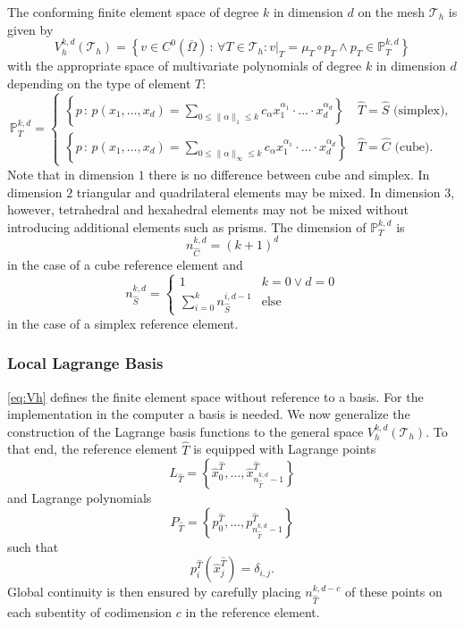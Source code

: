 \documentclass[a4paper,12pt]{article}
\begin{document}
The conforming finite element space of degree $k$ in dimension $d$ on the mesh
$\mathcal{T}_h$ is given by
\begin{equation}
V_h^{k,d}(\mathcal{T}_h) = \left\{ v\in C^0(\overline{\Omega}) \,:\, 
\forall T\in\mathcal{T}_h : v|_T = \mu_T \circ p_T \wedge p_T\in\mathbb{P}_T^{k,d}\right\}
\label{eq:Vh}
\end{equation}
with the appropriate space of multivariate polynomials of degree $k$ in dimension $d$
depending on the type of element $T$:
\begin{equation}
\mathbb{P}_T^{k,d} = \left\{\begin{array}{ll}
\left\{ p\,:\, p(x_1,\ldots,x_d) = \sum\limits_{0\leq\|\alpha\|_1\leq k} c_\alpha
x_1^{\alpha_1}\cdot\ldots\cdot x_d^{\alpha_d}\right\} & \text{$\hat T = \hat S$ (simplex)}, \\
\left\{ p\,:\, p(x_1,\ldots,x_d) = \sum\limits_{0\leq\|\alpha\|_\infty\leq k} c_\alpha
x_1^{\alpha_1}\cdot\ldots\cdot x_d^{\alpha_d}\right\} & \text{$\hat T = \hat C$ (cube)} .
\end{array}\right .
\end{equation}
Note that in dimension $1$ there is no difference between cube and simplex.
In dimension $2$ triangular and quadrilateral elements may be mixed. In 
dimension $3$, however, tetrahedral and hexahedral elements may not be mixed
without introducing additional elements such as prisms.
The dimension of  $\mathbb{P}_T^{k,d}$ is
\begin{equation*}
n_{\hat C}^{k,d} = (k+1)^d
\end{equation*}
in the case of a cube reference element and
\begin{equation*}
n_{\hat S}^{k,d} = \left\{ \begin{array}{ll}
1 & k=0 \vee d=0\\
\sum_{i=0}^k n_{\hat S}^{i,d-1} &\text{else}
\end{array}\right .
\end{equation*}
in the case of a simplex reference element.

\subsubsection*{Local Lagrange Basis}

\eqref{eq:Vh} defines the finite element space without reference to a basis.
For the implementation in the computer a basis is needed. We now generalize
the construction of the Lagrange basis functions to the general space $V_h^{k,d}(\mathcal{T}_h)$.
To that end, the reference element $\hat T$ is equipped with Lagrange  
points 
$$L_{\hat T} = \left\{ \hat x^{\hat T}_0,\ldots,\hat x^{\hat T}_{n_{\hat T}^{k,d}-1} \right\}$$
and Lagrange polynomials 
$$P_{\hat T} = \left\{ p^{\hat T}_0,\ldots,p^{\hat T}_{n_{\hat T}^{k,d}-1}\right\}$$
such that $$p^{\hat T}_i(\hat x^{\hat T}_j) = \delta_{i,j}.$$
Global continuity is then ensured by carefully placing $n_{\hat T}^{k,d-c}$ of these
points on each subentity of codimension $c$ in the reference element. 
\end{document}
